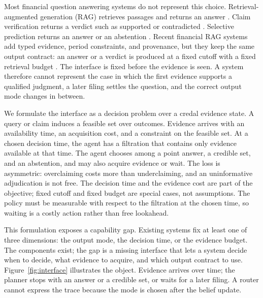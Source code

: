 \documentclass[11pt]{article}
\begin{document}
Most financial question answering systems do not represent this choice. Retrieval-augmented generation (RAG) retrieves passages and returns an answer \citep{lewis2020rag,jiang2023flare,asai2024selfrag,jeong2024adaptiverag}. Claim verification returns a verdict such as supported or contradicted \citep{zhao2024findver,rangapur2025finfact}. Selective prediction returns an answer or an abstention \citep{chow1970optimum,geifman2017selective}. Recent financial RAG systems add typed evidence, period constraints, and provenance, but they keep the same output contract: an answer or a verdict is produced at a fixed cutoff with a fixed retrieval budget \citep{mansouri2026finrank,jiang2026finrate,chen2026hcrag,chi2026finsagent}. The interface is fixed before the evidence is seen. A system therefore cannot represent the case in which the first evidence supports a qualified judgment, a later filing settles the question, and the correct output mode changes in between.

We formulate the interface as a decision problem over a credal evidence state. A query or claim induces a feasible set over outcomes. Evidence arrives with an availability time, an acquisition cost, and a constraint on the feasible set. At a chosen decision time, the agent has a filtration that contains only evidence available at that time. The agent chooses among a point answer, a credible set, and an abstention, and may also acquire evidence or wait. The loss is asymmetric: overclaiming costs more than underclaiming, and an uninformative adjudication is not free. The decision time and the evidence cost are part of the objective; fixed cutoff and fixed budget are special cases, not assumptions. The policy must be measurable with respect to the filtration at the chosen time, so waiting is a costly action rather than free lookahead.

This formulation exposes a capability gap. Existing systems fix at least one of three dimensions: the output mode, the decision time, or the evidence budget. The components exist; the gap is a missing interface that lets a system decide when to decide, what evidence to acquire, and which output contract to use. Figure~\ref{fig:interface} illustrates the object. Evidence arrives over time; the planner stops with an answer or a credible set, or waits for a later filing. A router cannot express the trace because the mode is chosen after the belief update.
\end{document}
